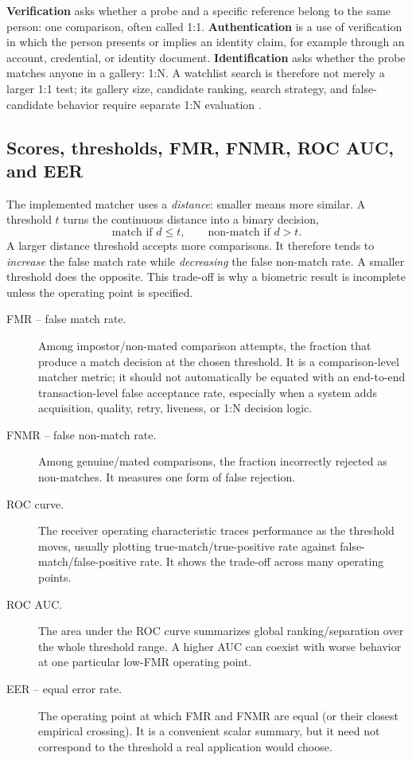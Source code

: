 \documentclass[10pt,a4paper]{article}
\begin{document}
\textbf{Verification} asks whether a probe and a specific reference belong to the same
person: one comparison, often called 1:1. \textbf{Authentication} is a use of verification
in which the person presents or implies an identity claim, for example through an account,
credential, or identity document. \textbf{Identification} asks whether the probe matches
anyone in a gallery: 1:N. A watchlist search is therefore not merely a larger 1:1 test; its
gallery size, candidate ranking, search strategy, and false-candidate behavior require
separate 1:N evaluation \cite{nistfrte1n}.

\subsection{Scores, thresholds, FMR, FNMR, ROC AUC, and EER}

The implemented matcher uses a \emph{distance}: smaller means more similar. A threshold $t$
turns the continuous distance into a binary decision,
\[
\text{match if } d\le t,\qquad \text{non-match if } d>t.
\]
A larger distance threshold accepts more comparisons. It therefore tends to \emph{increase}
the false match rate while \emph{decreasing} the false non-match rate. A smaller threshold
does the opposite. This trade-off is why a biometric result is incomplete unless the
operating point is specified.

\begin{description}
\item[FMR -- false match rate.] Among impostor/non-mated comparison attempts, the fraction
that produce a match decision at the chosen threshold. It is a comparison-level matcher
metric; it should not automatically be equated with an end-to-end transaction-level false
acceptance rate, especially when a system adds acquisition, quality, retry, liveness, or
1:N decision logic.
\item[FNMR -- false non-match rate.] Among genuine/mated comparisons, the fraction incorrectly
rejected as non-matches. It measures one form of false rejection.
\item[ROC curve.] The receiver operating characteristic traces performance as the threshold
moves, usually plotting true-match/true-positive rate against false-match/false-positive
rate. It shows the trade-off across many operating points.
\item[ROC AUC.] The area under the ROC curve summarizes global ranking/separation over the
whole threshold range. A higher AUC can coexist with worse behavior at one particular low-FMR
operating point.
\item[EER -- equal error rate.] The operating point at which FMR and FNMR are equal (or their
closest empirical crossing). It is a convenient scalar summary, but it need not correspond
to the threshold a real application would choose.
\end{description}
\end{document}
